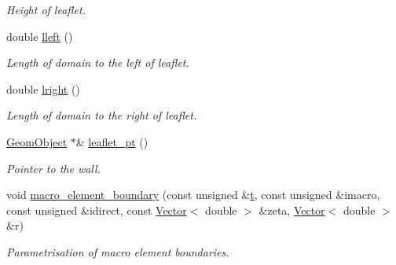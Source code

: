 \begin{DoxyCompactItemize}
\begin{DoxyCompactList}\small\item\em Height of leaflet. \end{DoxyCompactList}\item 
double \hyperlink{classoomph_1_1ChannelWithLeafletDomain_a5538092062970dbd2f02218a05639d49}{lleft} ()
\begin{DoxyCompactList}\small\item\em Length of domain to the left of leaflet. \end{DoxyCompactList}\item 
double \hyperlink{classoomph_1_1ChannelWithLeafletDomain_aee74846110e70cd5538386e1ccb0ce7c}{lright} ()
\begin{DoxyCompactList}\small\item\em Length of domain to the right of leaflet. \end{DoxyCompactList}\item 
\hyperlink{classoomph_1_1GeomObject}{Geom\+Object} $\ast$\& \hyperlink{classoomph_1_1ChannelWithLeafletDomain_a91d7d8d2f564c5e9d2ee07449b2653c9}{leaflet\+\_\+pt} ()
\begin{DoxyCompactList}\small\item\em Pointer to the wall. \end{DoxyCompactList}\item 
void \hyperlink{classoomph_1_1ChannelWithLeafletDomain_ae4b123847f4ab6e242a0409d72fe5cbd}{macro\+\_\+element\+\_\+boundary} (const unsigned \&\hyperlink{cfortran_8h_af6f0bd3dc13317f895c91323c25c2b8f}{t}, const unsigned \&imacro, const unsigned \&idirect, const \hyperlink{classoomph_1_1Vector}{Vector}$<$ double $>$ \&zeta, \hyperlink{classoomph_1_1Vector}{Vector}$<$ double $>$ \&r)
\begin{DoxyCompactList}\small\item\em Parametrisation of macro element boundaries. \end{DoxyCompactList}\end{DoxyCompactItemize}
